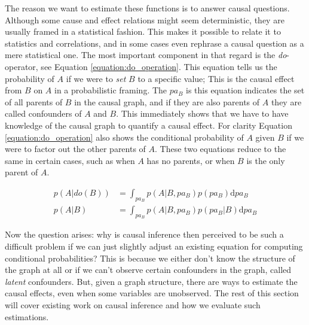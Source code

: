\documentclass{article}
\begin{document}
The reason we want to estimate these functions is to answer causal questions. Although some cause and effect relations might seem deterministic, they are usually framed in a statistical fashion. This makes it possible to relate it to statistics and correlations, and in some cases even rephrase a causal question as a mere statistical one. The most important component in that regard is the \textit{do}-operator, see Equation \ref{equation:do_operation}. This equation tells us the probability of $A$ if we were to \textit{set} $B$ to a specific value; This is the causal effect from $B$ on $A$ in a probabilistic framing. The $pa_{B}$ is this equation indicates the set of all parents of $B$ in the causal graph, and if they are also parents of $A$ they are called confounders of $A$ and $B$. This immediately shows that we have to have knowledge of the causal graph to quantify a causal effect. For clarity  Equation \ref{equation:do_operation} also shows the conditional probability of $A$ given $B$ if we were to factor out the other parents of $A$. These two equations reduce to the same in certain cases, such as when $A$ has no parents, or when $B$ is the only parent of $A$. 

\begin{align}\label{equation:do_operation}
    p(A | do(B)) &= \int_{pa_B} p(A | B, pa_{B}) p(pa_{B}) \text{d} pa_B\\
    p(A | B) &= \int_{pa_B} p(A | B, pa_{B}) p(pa_{B}|B) \text{d} pa_B
\end{align}

Now the question arises: why is causal inference then perceived to be such a difficult problem if we can just slightly adjust an existing equation for computing conditional probabilities? This is because we either don't know the structure of the graph at all or if we can't observe certain confounders in the graph, called \textit{latent} confounders. But, given a graph structure, there are ways to estimate the causal effects, even when some variables are unobserved. The rest of this section will cover existing work on causal inference and how we evaluate such estimations.

\end{document}
